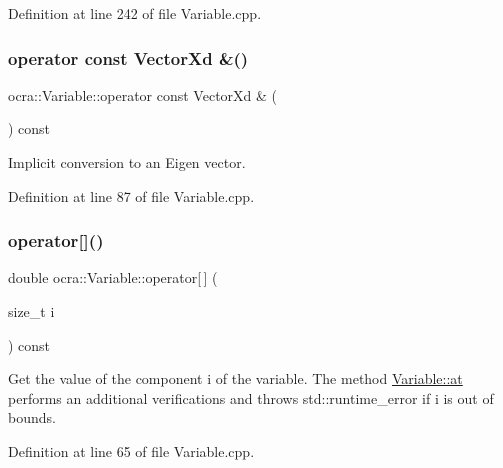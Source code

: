 Definition at line 242 of file Variable.\+cpp.

\hypertarget{classocra_1_1Variable_a53abfa51af0549ba88f457091721fc01}{}\label{classocra_1_1Variable_a53abfa51af0549ba88f457091721fc01} 
\subsubsection{\texorpdfstring{operator const Vector\+Xd \&()}{operator const VectorXd \&()}}
{\footnotesize\ttfamily ocra\+::\+Variable\+::operator const Vector\+Xd \& (\begin{DoxyParamCaption}{ }\end{DoxyParamCaption}) const}



Implicit conversion to an Eigen vector. 



Definition at line 87 of file Variable.\+cpp.

\hypertarget{classocra_1_1Variable_a2326e0b8b2885dd44b654c55163a712c}{}\label{classocra_1_1Variable_a2326e0b8b2885dd44b654c55163a712c} 
\subsubsection{\texorpdfstring{operator[]()}{operator[]()}}
{\footnotesize\ttfamily double ocra\+::\+Variable\+::operator\mbox{[}$\,$\mbox{]} (\begin{DoxyParamCaption}\item[{size\+\_\+t}]{i }\end{DoxyParamCaption}) const}

Get the value of the component i of the variable. The method \hyperlink{classocra_1_1Variable_aa63236c657ccd8a0f347f257be5ba8fc}{Variable\+::at} performs an additional verifications and throws std\+::runtime\+\_\+error if i is out of bounds. 

Definition at line 65 of file Variable.\+cpp.

\hypertarget{classocra_1_1Variable_a0c983344cab7d6ca593cc21e47780b19}{}\label{classocra_1_1Variable_a0c983344cab7d6ca593cc21e47780b19} 
